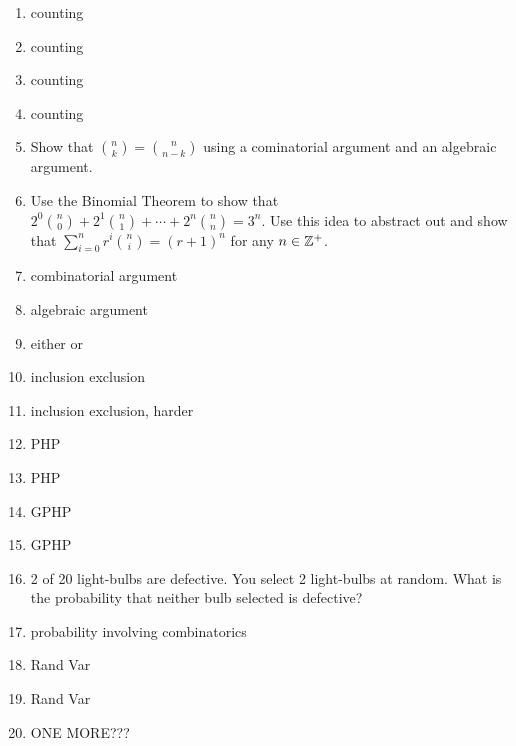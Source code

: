 \documentclass[main.tex]{subfiles}
\begin{document}
\begin{enumerate}
	\item counting
	\item counting
	\item counting
	\item counting
	\item Show that \(\binom{n}{k} =  \binom{n}{n-k}\) using a cominatorial argument and an algebraic argument.
	\item Use the Binomial Theorem to show that \(2^0\binom{n}{0} + 2^1\binom{n}{1} + \cdots + 2^n\binom{n}{n} = 3^n\). Use this idea to abstract out and show that \(\sum_{i=0}^{n} r^i \binom{n}{i} = (r+1)^n\) for any \(n \in \mathbb{Z}^+\).
	\item combinatorial argument
	\item algebraic argument
	\item either or
	\item inclusion exclusion
	\item inclusion exclusion, harder
	\item PHP
	\item PHP
	\item GPHP
	\item GPHP
	\item 2 of 20 light-bulbs are defective. You select 2 light-bulbs at random. What is the probability that neither bulb selected is defective? %
	\item probability involving combinatorics
	\item Rand Var
	\item Rand Var
	\item ONE MORE???
\end{enumerate}
\end{document}
